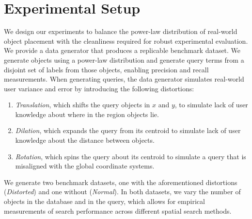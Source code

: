 \section{Experimental Setup}
\label{section:experimental_setup}


\par{
    We design our experiments to balance the power-law distribution of real-world object placement with the cleanliness required for robust experimental evaluation. 
    We provide a data generator that produces a replicable benchmark dataset.
    We generate objects using a power-law distribution and generate query terms from a disjoint set of labels from those objects, enabling precision and recall measurements.
    When generating queries, the data generator simulates real-world user variance and error by introducing the following distortions:
    \begin{enumerate}
        \item \textit{Translation}, which shifts the query objects in $x$ and $y$, to simulate lack of user knowledge about where in the region objects lie.
        \item \textit{Dilation}, which expands the query from its centroid to simulate lack of user knowledge about the distance between objects.
        \item \textit{Rotation}, which spins the query about its centroid to simulate a query that is misaligned with the global coordinate systems.
    \end{enumerate}
    }
\par{
    We generate two benchmark datasets, one with the aforementioned distortions (\textit{Distorted}) and one without (\textit{Normal}). 
    In both datasets, we vary the number of objects in the database and in the query, which allows for empirical measurements of search performance across different spatial search methods.
    }
